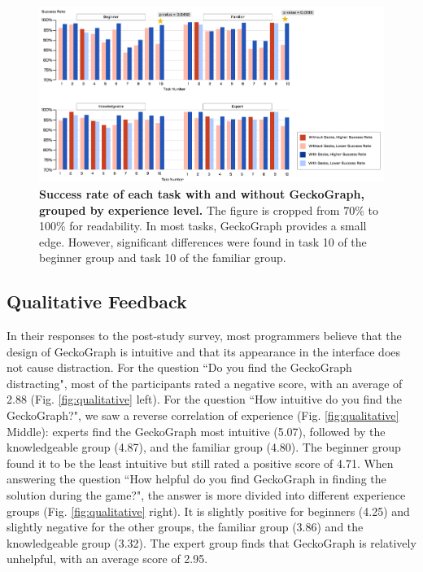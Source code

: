 \documentclass[preprint,12pt]{elsarticle}
\begin{document}
\begin{figure}[]
  \includegraphics[width=\linewidth]{figures/SuccessfulRate}
  \caption{\label{fig:success-rate}{\bf Success rate of each task with and without GeckoGraph, grouped by experience level.} The figure is cropped from 70\% to 100\% for readability. In most tasks, GeckoGraph provides a small edge. However, significant differences were found in task 10 of the beginner group and task 10 of the familiar group. }
\end{figure}

\subsection{Qualitative Feedback}
In their responses to the post-study survey, most programmers believe that the design of GeckoGraph is intuitive and that its appearance in the interface does not cause distraction.
For the question ``Do you find the GeckoGraph distracting", most of the participants rated a negative score, with an average of 2.88 (Fig. \ref{fig:qualitative} left). For the question ``How intuitive do you find the GeckoGraph?", we saw a reverse correlation of experience (Fig. \ref{fig:qualitative} Middle): experts find the GeckoGraph most intuitive (5.07), followed by the knowledgeable group (4.87), and the familiar group (4.80). The beginner group found it to be the least intuitive but still rated a positive score of 4.71. 
When answering the question ``How helpful do you find GeckoGraph in finding the solution during the game?", the answer is more divided into different experience groups (Fig. \ref{fig:qualitative} right). It is slightly positive for beginners (4.25) and slightly negative for the other groups, the familiar group (3.86) and the knowledgeable group (3.32). The expert group finds that GeckoGraph is relatively unhelpful, with an average score of 2.95.
\end{document}
